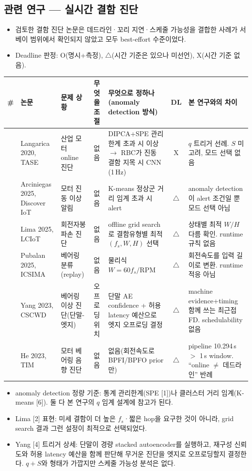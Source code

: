\documentclass[10pt]{article}
\begin{document}
\subsection{관련 연구 --- 실시간 결함 진단}
\begin{itemize}
\item 검토한 결함 진단 논문은 데드라인·꼬리 지연·스케줄 가능성을 결합한 사례가 서베이 범위에서 확인되지 않았고 모두 best-effort 수준이었다.
\item Deadline 판정: O(명시+측정), $\triangle$(시간 기준은 있으나 미선언), X(시간 기준 없음).
\end{itemize}
\begin{center}\scriptsize
\begin{tabular}{@{}cL{2.3cm}L{2.4cm}L{1.6cm}L{4.4cm}cL{3.0cm}@{}}
\toprule
\# & 논문 & 문제 상황 & 무엇을 조절 & 무엇으로 정하나 (anomaly detection 방식) & DL & 본 연구와의 차이 \\ \midrule
[1] & Langarica 2020, TASE & 산업 모터 online 진단 & 없음 & DIPCA+SPE 관리한계 초과 시 이상 $\rightarrow$ RBC가 진동 결함 지목 시 CNN (1\,Hz) & X & $q$ 트리거 선례. $S$ 미고려, 모드 선택 없음 \\
[6] & Arciniegas 2025, Discover IoT & 모터 진동 이상 알림 & 없음 & K-means 정상군 거리 임계 초과 시 alert & $\triangle$ & anomaly detection이 alert 조건일 뿐 모드 선택 아님 \\
[2] & Lima 2025, LCIoT & 회전자봉 파손 진단 & 없음 & offline grid search로 결함유형별 최적 $(f_s,W,H)$ 선택 & $\triangle$ & 상태별 최적 $W/H$ 다름 확인. runtime 규칙 없음 \\
[3] & Pubalan 2025, ICSIMA & 베어링 분류(replay) & 없음 & 물리식 $W=60 f_s/\mathrm{RPM}$ & $\triangle$ & 회전속도를 입력 길이로 변환. runtime 적응 아님 \\
[4] & Yang 2023, CSCWD & 베어링 이상 진단(단말-엣지) & 오프로딩 위치 & 단말 AE confidence + 허용 latency 예산으로 엣지 오프로딩 결정 & $\triangle$ & machine evidence+timing 함께 쓰는 최근접 FD. schedulability 없음 \\
[5] & He 2023, TIM & 모터 베어링 음향 진단 & 없음 & 없음(회전속도로 BPFI/BPFO prior만) & $\triangle$ & pipeline 10.294\,s $>$ 1\,s window. ``online $\ne$ 데드라인'' 반례 \\
\bottomrule
\end{tabular}
\end{center}
\begin{itemize}
\item anomaly detection 정량 기준: 통계 관리한계(SPE [1])나 클러스터 거리 임계(K-means [6]). 둘 다 본 연구의 $q$ 임계 설계에 참고가 된다.
\item Lima [2] 표현: 미세 결함이 더 높은 $f_s$·짧은 hop을 요구한 것이 아니라, grid search 결과 그런 설정이 최적으로 선택되었다.
\item Yang [4] 트리거 상세: 단말이 경량 stacked autoencoder를 실행하고, 재구성 신뢰도와 허용 latency 예산을 함께 판단해 무거운 진단을 엣지로 오프로딩할지 결정한다. $q+S$와 형태가 가깝지만 스케줄 가능성 분석은 없다.
\end{itemize}
\end{document}
